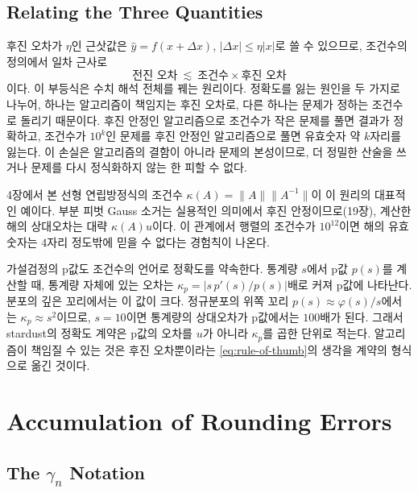 \subsection{Relating the Three Quantities}

후진 오차가 $\eta$인 근삿값은 $\hat y=f(x+\Delta x)$, $|\Delta x|\le\eta|x|$로 쓸 수 있으므로, 조건수의 정의에서 일차 근사로
\begin{equation}
\label{eq:rule-of-thumb}
\text{전진 오차}\ \lesssim\ \text{조건수}\times\text{후진 오차}
\end{equation}
이다. 이 부등식은 수치 해석 전체를 꿰는 원리이다. 정확도를 잃는 원인을 두 가지로 나누어, 하나는 알고리즘이 책임지는 후진 오차로, 다른 하나는 문제가 정하는 조건수로 돌리기 때문이다. 후진 안정인 알고리즘으로 조건수가 작은 문제를 풀면 결과가 정확하고, 조건수가 $10^{k}$인 문제를 후진 안정인 알고리즘으로 풀면 유효숫자 약 $k$자리를 잃는다. 이 손실은 알고리즘의 결함이 아니라 문제의 본성이므로, 더 정밀한 산술을 쓰거나 문제를 다시 정식화하지 않는 한 피할 수 없다.

4장에서 본 선형 연립방정식의 조건수 $\kappa(A)=\|A\|\|A^{-1}\|$이 이 원리의 대표적인 예이다. 부분 피벗 Gauss 소거는 실용적인 의미에서 후진 안정이므로(19장), 계산한 해의 상대오차는 대략 $\kappa(A)u$이다. 이 관계에서 행렬의 조건수가 $10^{12}$이면 해의 유효숫자는 $4$자리 정도밖에 믿을 수 없다는 경험칙이 나온다.

\begin{instardust}
가설검정의 p값도 조건수의 언어로 정확도를 약속한다. 통계량 $s$에서 p값 $p(s)$를 계산할 때, 통계량 자체에 있는 오차는 $\kappa_p=|s\,p'(s)/p(s)|$배로 커져 p값에 나타난다. 분포의 깊은 꼬리에서는 이 값이 크다. 정규분포의 위쪽 꼬리 $p(s)\approx\varphi(s)/s$에서는 $\kappa_p\approx s^2$이므로, $s=10$이면 통계량의 상대오차가 p값에서는 $100$배가 된다. 그래서 stardust의 정확도 계약은 p값의 오차를 $u$가 아니라 $\kappa_p$를 곱한 단위로 적는다. 알고리즘이 책임질 수 있는 것은 후진 오차뿐이라는 \cref{eq:rule-of-thumb}의 생각을 계약의 형식으로 옮긴 것이다.
\end{instardust}

\section{Accumulation of Rounding Errors}
\label{sec:accumulation}

\subsection{The $\gamma_n$ Notation}

